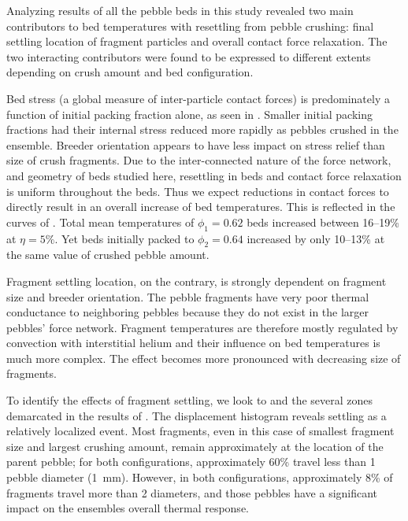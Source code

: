 Analyzing results of all the pebble beds in this study revealed two main contributors to bed temperatures with resettling from pebble crushing: final settling location of fragment particles and overall contact force relaxation. The two interacting contributors were found to be expressed to different extents depending on crush amount and bed configuration.

Bed stress (a global measure of inter-particle contact forces) is predominately a function of initial packing fraction alone, as seen in . Smaller initial packing fractions had their internal stress reduced more rapidly as pebbles crushed in the ensemble. Breeder orientation appears to have less impact on stress relief than size of crush fragments. Due to the inter-connected nature of the force network, and geometry of beds studied here, resettling in beds and contact force relaxation is uniform throughout the beds. Thus we expect reductions in contact forces to directly result in an overall increase of bed temperatures. This is reflected in the curves of . Total mean temperatures of $\phi_1 = 0.62$ beds increased between \numrange{16}{19}\% at $\eta = 5\%$. Yet beds initially packed to $\phi_2 = 0.64$ increased by only \numrange{10}{13}\% at the same value of crushed pebble amount.

Fragment settling location, on the contrary, is strongly dependent on fragment size and breeder orientation. The pebble fragments have very poor thermal conductance to neighboring pebbles because they do not exist in the larger pebbles' force network. Fragment temperatures are therefore mostly regulated by convection with interstitial helium and their influence on bed temperatures is much more complex. The effect becomes more pronounced with decreasing size of fragments.

To identify the effects of fragment settling, we look to  and the several zones demarcated in the results of . The displacement histogram reveals settling as a relatively localized event. Most fragments, even in this case of smallest fragment size and largest crushing amount, remain approximately at the location of the parent pebble; for both configurations, approximately 60\% travel less than 1 pebble diameter (\SI{1}{\milli\meter}). However, in both configurations, approximately 8\% of fragments travel more than 2 diameters, and those pebbles have a significant impact on the ensembles overall thermal response.

